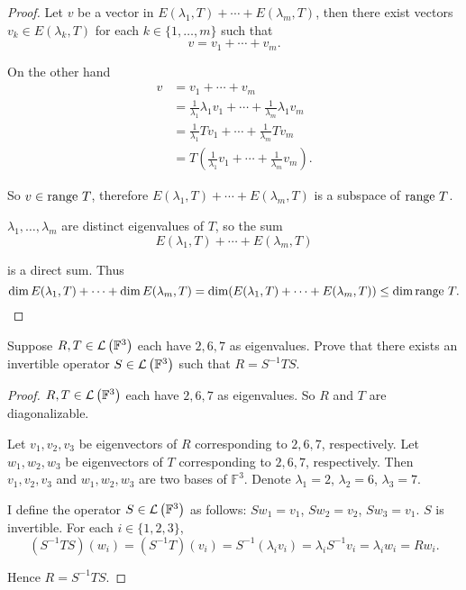 \begin{proof}
    Let $v$ be a vector in $E(\lambda_{1}, T) + \cdots + E(\lambda_{m}, T)$, then there exist vectors $v_{k}\in E(\lambda_{k}, T)$ for each $k\in\{ 1, \ldots, m \}$ such that
    \[
        v = v_{1} + \cdots + v_{m}.
    \]

    On the other hand
    \begin{align*}
        v & = v_{1} + \cdots + v_{m}                                                                 \\
          & = \frac{1}{\lambda_{1}}\lambda_{1}v_{1} + \cdots + \frac{1}{\lambda_{m}}\lambda_{1}v_{m} \\
          & =  \frac{1}{\lambda_{1}}Tv_{1} + \cdots + \frac{1}{\lambda_{m}}Tv_{m}                    \\
          & = T\left(\frac{1}{\lambda_{1}}v_{1} + \cdots + \frac{1}{\lambda_{m}}v_{m}\right).
    \end{align*}

    So $v\in \operatorname{range}\,{T}$, therefore $E(\lambda_{1}, T) + \cdots + E(\lambda_{m}, T)$ is a subspace of $\operatorname{range}\,{T}$.

    $\lambda_{1}, \ldots, \lambda_{m}$ are distinct eigenvalues of $T$, so the sum
    \[
        E(\lambda_{1}, T) + \cdots + E(\lambda_{m}, T)
    \]

    is a direct sum. Thus
    \[
        \dim E(\lambda_{1}, T) + \cdots + \dim E(\lambda_{m}, T) = \dim(E(\lambda_{1}, T) + \cdots + E(\lambda_{m}, T))\leq \dim\operatorname{range}\,{T}.\qedhere
    \]
\end{proof}
\newpage

\begin{exercise}
    Suppose $R, T\in \mathcal{L}\left({\mathbb{F}^{3}}\right)$ each have $2, 6, 7$ as eigenvalues. Prove that there exists an invertible operator $S\in\mathcal{L}\left({\mathbb{F}^{3}}\right)$ such that $R = S^{-1}TS$.
\end{exercise}

\begin{proof}
    $R, T\in \mathcal{L}\left({\mathbb{F}^{3}}\right)$ each have $2, 6, 7$ as eigenvalues. So $R$ and $T$ are diagonalizable.

    Let $v_{1}, v_{2}, v_{3}$ be eigenvectors of $R$ corresponding to $2, 6, 7$, respectively. Let $w_{1}, w_{2}, w_{3}$ be eigenvectors of $T$ corresponding to $2, 6, 7$, respectively. Then $v_{1}, v_{2}, v_{3}$ and $w_{1}, w_{2}, w_{3}$ are two bases of $\mathbb{F}^{3}$. Denote $\lambda_{1} = 2$, $\lambda_{2} = 6$, $\lambda_{3} = 7$.

    I define the operator $S\in\mathcal{L}\left({\mathbb{F}^{3}}\right)$ as follows: $Sw_{1} = v_{1}$, $Sw_{2} = v_{2}$, $Sw_{3} = v_{1}$. $S$ is invertible. For each $i\in\{1, 2, 3\}$,
    \[
        (S^{-1}TS)(w_{i}) = (S^{-1}T)(v_{i}) = S^{-1}(\lambda_{i}v_{i}) = \lambda_{i}S^{-1}v_{i} = \lambda_{i}w_{i} = Rw_{i}.
    \]

    Hence $R = S^{-1}TS$.
\end{proof}
\newpage

